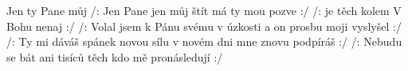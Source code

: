 \begin{TEXT}{Jen ty Pane můj}
\REFREN  /: Jen  Pane  jen  můj štít \NL
má  ty mou  pozve :/ 
\SLOKA /:  je těch  kolem  \NL
V Bohu   nenaj :/ 
\SLOKA /: Volal jsem k Pánu svému v úzkosti \NL
a on prosbu moji vyslyšel :/ 
\SLOKA /: Ty mi dáváš spánek novou sílu \NL
v novém dni mne znovu podpíráš :/ 
\SLOKA /: Nebudu se bát ani tisíců \NL
těch kdo mě pronásledují :/ \NL
\end{TEXT}
